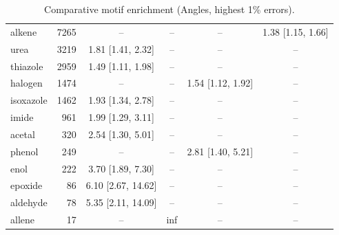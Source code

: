\begin{table}[h!]
\begin{tabular}{l r c c c c}
    alkene & 7265 & -- & -- & -- & 1.38\,\,[1.15, 1.66] \\
    urea & 3219 & 1.81\,\,[1.41, 2.32] & -- & -- & -- \\
    thiazole & 2959 & 1.49\,\,[1.11, 1.98] & -- & -- & -- \\
    halogen & 1474 & -- & -- & 1.54\,\,[1.12, 1.92] & -- \\
    isoxazole & 1462 & 1.93\,\,[1.34, 2.78] & -- & -- & -- \\
    imide & 961 & 1.99\,\,[1.29, 3.11] & -- & -- & -- \\
    acetal & 320 & 2.54\,\,[1.30, 5.01] & -- & -- & -- \\
    phenol & 249 & -- & -- & 2.81\,\,[1.40, 5.21] & -- \\
    enol & 222 & 3.70\,\,[1.89, 7.30] & -- & -- & -- \\
    epoxide & 86 & 6.10\,\,[2.67, 14.62] & -- & -- & -- \\
    aldehyde & 78 & 5.35\,\,[2.11, 14.09] & -- & -- & -- \\
    allene & 17 & -- & inf & -- & -- \\
    \hline
  \end{tabular}
  \caption{Comparative motif enrichment (Angles, highest 1\% errors).}
  \label{tab:compare_angles_worst}
\end{table}
